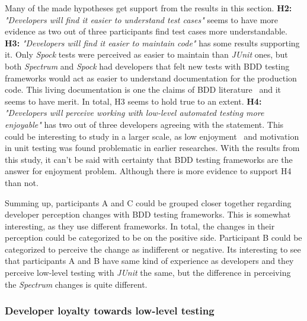 Many of the made hypotheses get support from the results in this section.
\textbf{H2:} \textit{"Developers will find it easier to understand test cases"} seems to have more evidence as two out of
three participants find test cases more understandable. \textbf{H3:} \textit{"Developers will find it easier to maintain code"}
has some results supporting it. Only \textit{Spock} tests were perceived as easier to maintain than \textit{JUnit} ones, but both \textit{Spectrum}
and \textit{Spock} had developers that felt new tests with BDD testing frameworks would act as easier to understand documentation for the
production code. This living documentation is one the claims of BDD literature~\cite{smart2014bdd} and it seems to have
merit. In total, H3 seems to hold true to an extent.
\textbf{H4:} \textit{"Developers will perceive working with low-level automated testing more enjoyable"} has two out
of three developers agreeing with the statement. This could be interesting to study in a larger scale, as low enjoyment~\cite{daka2014survey}
and motivation~\cite{runeson2006survey} in unit testing was found problematic in earlier researches. With the results from
this study, it can't be said with certainty that BDD testing frameworks are the answer for enjoyment problem. Although
there is more evidence to support H4 than not.


Summing up, participants A and C could be grouped closer together regarding developer perception changes with BDD testing
frameworks. This is somewhat interesting, as they use different frameworks. In total, the changes in their perception could be categorized
to be on the positive side. Participant B could be categorized to perceive the change as indifferent or negative. Its interesting
to see that participants A and B have same kind of experience as developers and they perceive low-level testing with \textit{JUnit} the same,
but the difference in perceiving the \textit{Spectrum} changes is quite different.


\subsubsection{Developer loyalty towards low-level testing}

